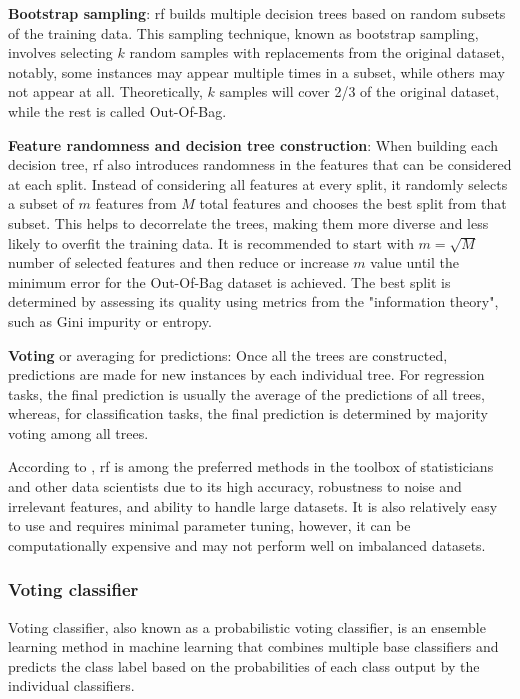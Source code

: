 \textbf{Bootstrap sampling}: \gls{rf} builds multiple decision trees based on random subsets of the training data. This sampling technique, known as bootstrap sampling, involves selecting $k$ random samples with replacements from the original dataset, notably, some instances may appear multiple times in a subset, while others may not appear at all. Theoretically, $k$ samples will cover 2/3 of the original dataset, while the rest is called Out-Of-Bag.

\textbf{Feature randomness and decision tree construction}: When building each decision tree, \gls{rf} also introduces randomness in the features that can be considered at each split. Instead of considering all features at every split, it randomly selects a subset of $m$ features from $M$ total features and chooses the best split from that subset. This helps to decorrelate the trees, making them more diverse and less likely to overfit the training data. It is recommended to start with $m = \sqrt{M}$ number of selected features and then reduce or increase $m$ value until the minimum error for the Out-Of-Bag dataset is achieved. The best split is determined by assessing its quality using metrics from the "information theory", such as Gini impurity or entropy.

\textbf{Voting} or averaging for predictions: Once all the trees are constructed, predictions are made for new instances by each individual tree. For regression tasks, the final prediction is usually the average of the predictions of all trees, whereas, for classification tasks, the final prediction is determined by majority voting among all trees.

According to \textcite{Genuer2020}, \gls{rf} is among the preferred methods in the toolbox of statisticians and other data scientists due to its high accuracy, robustness to noise and irrelevant features, and ability to handle large datasets. It is also relatively easy to use and requires minimal parameter tuning, however, it can be computationally expensive and may not perform well on imbalanced datasets.


\subsubsection{Voting classifier}
\label{subsubsec:machine_learning_voting_classifer}

Voting classifier, also known as a probabilistic voting classifier, is an ensemble learning method in machine learning that combines multiple base classifiers and predicts the class label based on the probabilities of each class output by the individual classifiers.


